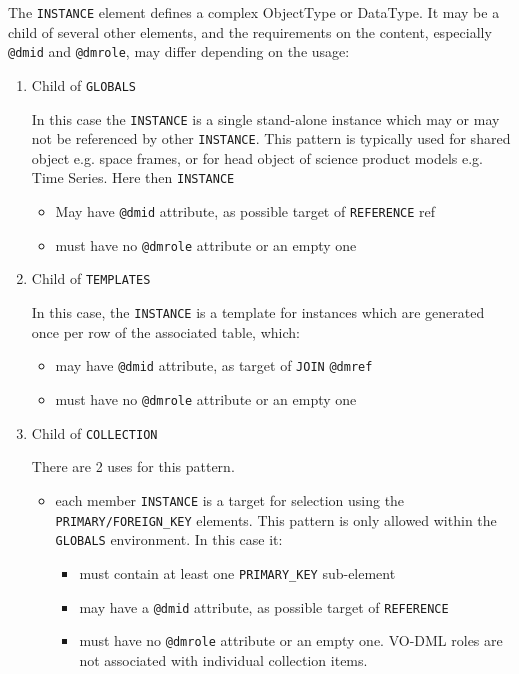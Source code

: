 The \texttt{INSTANCE} element defines a complex ObjectType or DataType.
It may be a child of several other elements, and the requirements on
the content, especially  \texttt{@dmid} and  \texttt{@dmrole}, may differ depending on
the usage:


\begin{enumerate}
\item Child of \texttt{GLOBALS}

   In this case the \texttt{INSTANCE} is a single stand-alone instance which
   may or may not be referenced by other \texttt{INSTANCE}. This pattern is typically used for 
   shared object e.g. space frames, or for head object of science product models e.g. Time Series.
   Here then \texttt{INSTANCE}
  \begin{itemize}
     \item May have  \texttt{@dmid} attribute, as possible target of \texttt{REFERENCE} ref
     \item must have no  \texttt{@dmrole} attribute or an empty one
  \end{itemize}  
     
\item Child of \texttt{TEMPLATES}

  In this case, the \texttt{INSTANCE} is a template for instances which
  are generated once per row of the associated table, which:
  \begin{itemize}
     \item may have  \texttt{@dmid} attribute, as target of \texttt{JOIN} \texttt{@dmref}
     \item must have no  \texttt{@dmrole} attribute or an empty one
  \end{itemize}  

\item Child of \texttt{COLLECTION}

  There are 2 uses for this pattern.  
  \begin{itemize}
     \item each member \texttt{INSTANCE} is a target for selection using
           the \texttt{PRIMARY/FOREIGN\_KEY} elements. This pattern is only 
           allowed within the \texttt{GLOBALS} environment. In this case it:             
           \begin{itemize}
             \item must contain at least one \texttt{PRIMARY\_KEY} sub-element
             \item may have a  \texttt{@dmid} attribute, as possible target of \texttt{REFERENCE}              
             \item must have no  \texttt{@dmrole} attribute or an empty one. VO-DML roles are not associated
             with individual collection items.
           \end{itemize}


\end{itemize}
\end{enumerate}
